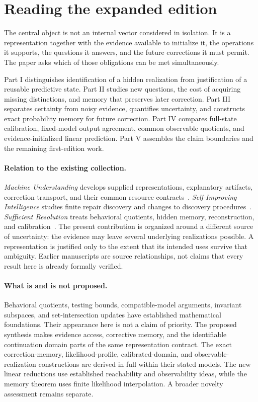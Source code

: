\documentclass[11pt,letterpaper]{article}
\theoremstyle{plain}
\theoremstyle{definition}
\begin{document}
\section*{Reading the expanded edition}
The central object is not an internal vector considered in isolation. It is a representation together with the evidence available to initialize it, the operations it supports, the questions it answers, and the future corrections it must permit. The paper asks which of those obligations can be met simultaneously.

Part I distinguishes identification of a hidden realization from justification of a reusable predictive state. Part II studies new questions, the cost of acquiring missing distinctions, and memory that preserves later correction. Part III separates certainty from noisy evidence, quantifies uncertainty, and constructs exact probability memory for future correction. Part IV compares full-state calibration, fixed-model output agreement, common observable quotients, and evidence-initialized linear prediction. Part V assembles the claim boundaries and the remaining first-edition work.

\paragraph{Relation to the existing collection.}
\emph{Machine Understanding} develops supplied representations, explanatory artifacts, correction transport, and their common resource contracts~\cite{understanding}. \emph{Self-Improving Intelligence} studies finite repair discovery and changes to discovery procedures~\cite{selfimproving}. \emph{Sufficient Resolution} treats behavioral quotients, hidden memory, reconstruction, and calibration~\cite{resolution}. The present contribution is organized around a different source of uncertainty: the evidence may leave several underlying realizations possible. A representation is justified only to the extent that its intended uses survive that ambiguity. Earlier manuscripts are source relationships, not claims that every result here is already formally verified.

\paragraph{What is and is not proposed.}
Behavioral quotients, testing bounds, compatible-model arguments, invariant subspaces, and set-intersection updates have established mathematical foundations. Their appearance here is not a claim of priority. The proposed synthesis makes evidence access, corrective memory, and the identifiable continuation domain parts of the same representation contract. The exact correction-memory, likelihood-profile, calibrated-domain, and observable-realization constructions are derived in full within their stated models. The new linear reductions use established reachability and observability ideas, while the memory theorem uses finite likelihood interpolation. A broader novelty assessment remains separate.
\end{document}
